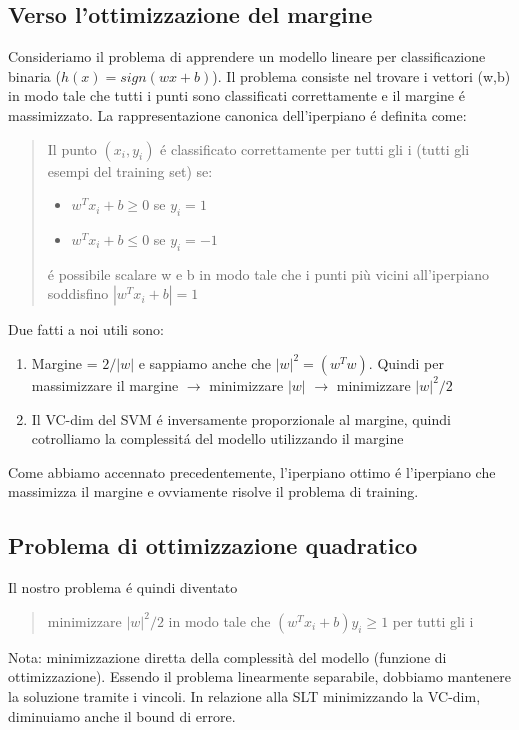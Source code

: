 \documentclass{article}
\begin{document}
\subsection{Verso l'ottimizzazione del margine}
Consideriamo il problema di apprendere un modello lineare per classificazione binaria \newline ($h(x)=sign(wx+b)$). Il problema consiste nel trovare i vettori (w,b) in modo tale che tutti i punti sono classificati correttamente e il margine é massimizzato. \newline
La rappresentazione canonica dell'iperpiano é definita come:
\begin{quote}
    Il punto $(x_i,y_i)$ é classificato correttamente per tutti gli i (tutti gli esempi del training set) se:
    \begin{itemize}
        \item $w^Tx_i+b \geq 0$ se $y_i=1$
        \item $w^Tx_i+b \leq 0$ se $y_i=-1$
    \end{itemize}
    é possibile scalare w e b in modo tale che i punti più vicini all'iperpiano soddisfino \newline $|w^Tx_i+b|=1$
\end{quote}
Due fatti a noi utili sono:
\begin{enumerate}
    \item Margine = $2/|w|$ e sappiamo anche che $|w|^2=(w^Tw)$. Quindi per massimizzare il margine $\rightarrow$ minimizzare $|w|$ $\rightarrow$ minimizzare $|w|^2/2$
    \item Il VC-dim del SVM é inversamente proporzionale al margine, quindi cotrolliamo la complessitá del modello utilizzando il margine
\end{enumerate}
Come abbiamo accennato precedentemente, l'iperpiano ottimo é l'iperpiano che massimizza il margine e ovviamente risolve il problema di training. 

\subsection{Problema di ottimizzazione quadratico}
Il nostro problema é quindi diventato
\begin{quote}
    minimizzare $|w|^2/2$ in modo tale che $(w^Tx_i+b)y_i\geq1$ per tutti gli i
\end{quote}
Nota: minimizzazione diretta della complessità del modello (funzione di ottimizzazione). Essendo il problema linearmente separabile, dobbiamo mantenere la soluzione tramite i vincoli. In relazione alla SLT minimizzando la VC-dim, diminuiamo anche il bound di errore.
\end{document}
